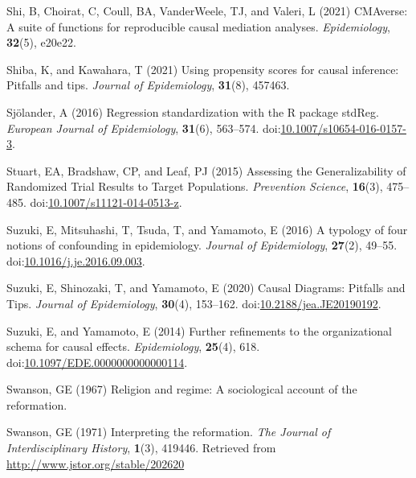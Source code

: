 \documentclass[
  singlecolumn]{article}
\newlength{\cslhangindent}
\newlength{\cslentryspacingunit} %
\newenvironment{CSLReferences}[2] %
 {%
  \setlength{\parindent}{0pt}
  \ifodd #1
  \let\oldpar\par
  \def\par{\hangindent=\cslhangindent\oldpar}
  \fi
  \setlength{\parskip}{#2\cslentryspacingunit}
 }%
 {}
\begin{document}
\begin{CSLReferences}{1}{0}
\leavevmode{}%
Shi, B, Choirat, C, Coull, BA, VanderWeele, TJ, and Valeri, L (2021)
CMAverse: A suite of functions for reproducible causal mediation
analyses. \emph{Epidemiology}, \textbf{32}(5), e20e22.

\leavevmode{}%
Shiba, K, and Kawahara, T (2021) Using propensity scores for causal
inference: Pitfalls and tips. \emph{Journal of Epidemiology},
\textbf{31}(8), 457463.

\leavevmode{}%
Sjölander, A (2016) Regression standardization with the R package
stdReg. \emph{European Journal of Epidemiology}, \textbf{31}(6),
563--574.
doi:\href{https://doi.org/10.1007/s10654-016-0157-3}{10.1007/s10654-016-0157-3}.

\leavevmode{}%
Stuart, EA, Bradshaw, CP, and Leaf, PJ (2015) Assessing the
Generalizability of Randomized Trial Results to Target Populations.
\emph{Prevention Science}, \textbf{16}(3), 475--485.
doi:\href{https://doi.org/10.1007/s11121-014-0513-z}{10.1007/s11121-014-0513-z}.

\leavevmode{}%
Suzuki, E, Mitsuhashi, T, Tsuda, T, and Yamamoto, E (2016) A typology of
four notions of confounding in epidemiology. \emph{Journal of
Epidemiology}, \textbf{27}(2), 49--55.
doi:\href{https://doi.org/10.1016/j.je.2016.09.003}{10.1016/j.je.2016.09.003}.

\leavevmode{}%
Suzuki, E, Shinozaki, T, and Yamamoto, E (2020) Causal Diagrams:
Pitfalls and Tips. \emph{Journal of Epidemiology}, \textbf{30}(4),
153--162.
doi:\href{https://doi.org/10.2188/jea.JE20190192}{10.2188/jea.JE20190192}.

\leavevmode{}%
Suzuki, E, and Yamamoto, E (2014) Further refinements to the
organizational schema for causal effects. \emph{Epidemiology},
\textbf{25}(4), 618.
doi:\href{https://doi.org/10.1097/EDE.0000000000000114}{10.1097/EDE.0000000000000114}.

\leavevmode{}%
Swanson, GE (1967) Religion and regime: A sociological account of the
reformation.

\leavevmode{}%
Swanson, GE (1971) Interpreting the reformation. \emph{The Journal of
Interdisciplinary History}, \textbf{1}(3), 419446. Retrieved from
\url{http://www.jstor.org/stable/202620}


\end{CSLReferences}
\end{document}
